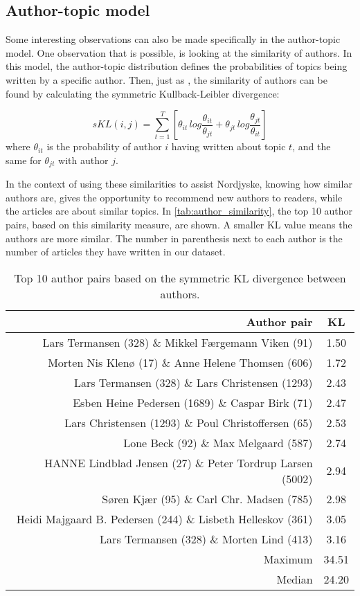 \subsection{Author-topic model}\label{sec:discussion_author_topic}
Some interesting observations can also be made specifically in the author-topic model.
One observation that is possible, is looking at the similarity of authors.
In this model, the author-topic distribution defines the probabilities of topics being written by a specific author.
Then, just as \citet{author_topic_2012}, the similarity of authors can be found by calculating the symmetric Kullback-Leibler divergence:

\begin{equation} \label{eq:author_similarity}
	sKL(i,j) = \sum_{t=1}^{T}\left[\theta_{it}\, log \frac{\theta_{it}}{\theta_{jt}} + \theta_{jt}\, log \frac{\theta_{jt}}{\theta_{it}}\right]
\end{equation}
\noindent where $\theta_{it}$ is the probability of author $i$ having written about topic $t$, and the same for $\theta_{jt}$ with author $j$.

In the context of using these similarities to assist Nordjyske, knowing how similar authors are, gives the opportunity to recommend new authors to readers, while the articles are about similar topics.
In \autoref{tab:author_similarity}, the top 10 author pairs, based on this similarity measure, are shown.
A smaller KL value means the authors are more similar.
The number in parenthesis next to each author is the number of articles they have written in our dataset.

\begin{table}[h]
	\centering
	\caption{Top 10 author pairs based on the symmetric KL divergence between authors.}
	\begin{tabular}{r|c}
		Author pair & KL \\
		\midrule
		Lars Termansen (328) \& Mikkel Færgemann Viken (91) & 1.50 \\
		Morten Nis Klenø (17) \& Anne Helene Thomsen (606) & 1.72 \\
		Lars Termansen (328) \& Lars Christensen (1293) & 2.43 \\
		Esben Heine Pedersen (1689) \& Caspar Birk (71) & 2.47 \\
		Lars Christensen (1293) \& Poul Christoffersen (65) & 2.53 \\
		Lone Beck (92) \& Max Melgaard (587) & 2.74 \\
		HANNE Lindblad Jensen (27) \& Peter Tordrup Larsen (5002) & 2.94 \\
		Søren Kjær (95) \& Carl Chr. Madsen (785) & 2.98 \\
		Heidi Majgaard B. Pedersen (244) \& Lisbeth Helleskov (361) & 3.05 \\
		Lars Termansen (328) \& Morten Lind (413) & 3.16 \\
		\midrule
		Maximum & 34.51 \\
		Median & 24.20 \\
	\end{tabular}
	\label{tab:author_similarity}
\end{table}

